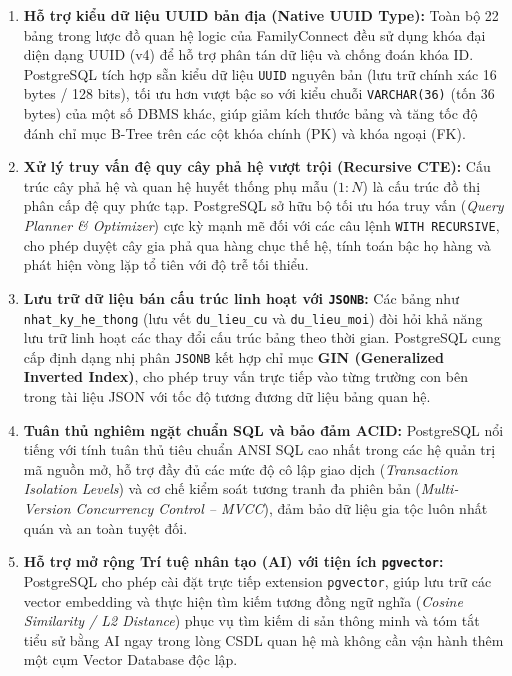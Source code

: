 \begin{enumerate}
    \item \textbf{Hỗ trợ kiểu dữ liệu UUID bản địa (Native UUID Type):}
    Toàn bộ 22 bảng trong lược đồ quan hệ logic của FamilyConnect đều sử dụng khóa đại diện dạng UUID (v4) để hỗ trợ phân tán dữ liệu và chống đoán khóa ID. PostgreSQL tích hợp sẵn kiểu dữ liệu \texttt{UUID} nguyên bản (lưu trữ chính xác 16 bytes / 128 bits), tối ưu hơn vượt bậc so với kiểu chuỗi \texttt{VARCHAR(36)} (tốn 36 bytes) của một số DBMS khác, giúp giảm kích thước bảng và tăng tốc độ đánh chỉ mục B-Tree trên các cột khóa chính (PK) và khóa ngoại (FK).

    \item \textbf{Xử lý truy vấn đệ quy cây phả hệ vượt trội (Recursive CTE):}
    Cấu trúc cây phả hệ và quan hệ huyết thống phụ mẫu ($1:N$) là cấu trúc đồ thị phân cấp đệ quy phức tạp. PostgreSQL sở hữu bộ tối ưu hóa truy vấn (\textit{Query Planner \& Optimizer}) cực kỳ mạnh mẽ đối với các câu lệnh \texttt{WITH RECURSIVE}, cho phép duyệt cây gia phả qua hàng chục thế hệ, tính toán bậc họ hàng và phát hiện vòng lặp tổ tiên với độ trễ tối thiểu.

    \item \textbf{Lưu trữ dữ liệu bán cấu trúc linh hoạt với \texttt{JSONB}:}
    Các bảng như \texttt{nhat\_ky\_he\_thong} (lưu vết \texttt{du\_lieu\_cu} và \texttt{du\_lieu\_moi}) đòi hỏi khả năng lưu trữ linh hoạt các thay đổi cấu trúc bảng theo thời gian. PostgreSQL cung cấp định dạng nhị phân \texttt{JSONB} kết hợp chỉ mục \textbf{GIN (Generalized Inverted Index)}, cho phép truy vấn trực tiếp vào từng trường con bên trong tài liệu JSON với tốc độ tương đương dữ liệu bảng quan hệ.

    \item \textbf{Tuân thủ nghiêm ngặt chuẩn SQL và bảo đảm ACID:}
    PostgreSQL nổi tiếng với tính tuân thủ tiêu chuẩn ANSI SQL cao nhất trong các hệ quản trị mã nguồn mở, hỗ trợ đầy đủ các mức độ cô lập giao dịch (\textit{Transaction Isolation Levels}) và cơ chế kiểm soát tương tranh đa phiên bản (\textit{Multi-Version Concurrency Control -- MVCC}), đảm bảo dữ liệu gia tộc luôn nhất quán và an toàn tuyệt đối.

    \item \textbf{Hỗ trợ mở rộng Trí tuệ nhân tạo (AI) với tiện ích \texttt{pgvector}:}
    PostgreSQL cho phép cài đặt trực tiếp extension \texttt{pgvector}, giúp lưu trữ các vector embedding và thực hiện tìm kiếm tương đồng ngữ nghĩa (\textit{Cosine Similarity / L2 Distance}) phục vụ tìm kiếm di sản thông minh và tóm tắt tiểu sử bằng AI ngay trong lòng CSDL quan hệ mà không cần vận hành thêm một cụm Vector Database độc lập.
\end{enumerate}

